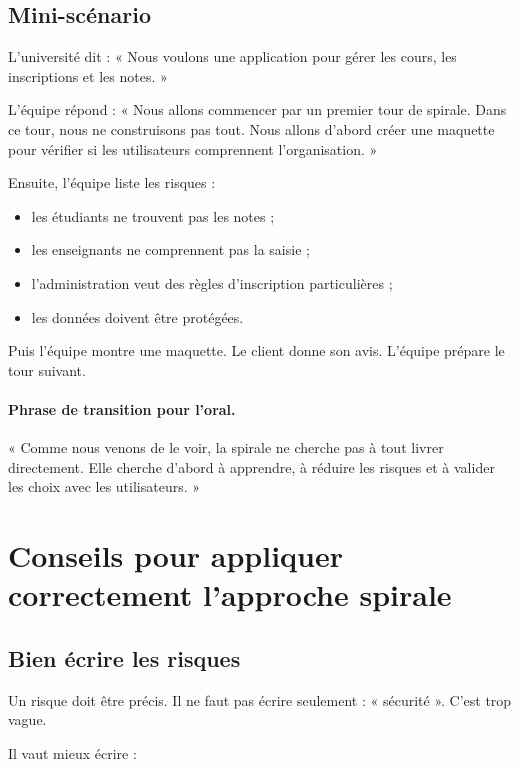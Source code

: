 \documentclass[12pt,a4paper]{article}
\begin{document}
\subsection{Mini-scénario}

L'université dit : « Nous voulons une application pour gérer les cours, les inscriptions et les notes. »

L'équipe répond : « Nous allons commencer par un premier tour de spirale. Dans ce tour, nous ne construisons pas tout. Nous allons d'abord créer une maquette pour vérifier si les utilisateurs comprennent l'organisation. »

Ensuite, l'équipe liste les risques :

\begin{itemize}
    \item les étudiants ne trouvent pas les notes ;
    \item les enseignants ne comprennent pas la saisie ;
    \item l'administration veut des règles d'inscription particulières ;
    \item les données doivent être protégées.
\end{itemize}

Puis l'équipe montre une maquette. Le client donne son avis. L'équipe prépare le tour suivant.

\paragraph{Phrase de transition pour l'oral.}
« Comme nous venons de le voir, la spirale ne cherche pas à tout livrer directement. Elle cherche d'abord à apprendre, à réduire les risques et à valider les choix avec les utilisateurs. »

\section{Conseils pour appliquer correctement l'approche spirale}

\subsection{Bien écrire les risques}

Un risque doit être précis. Il ne faut pas écrire seulement : « sécurité ». C'est trop vague.

Il vaut mieux écrire :
\end{document}
